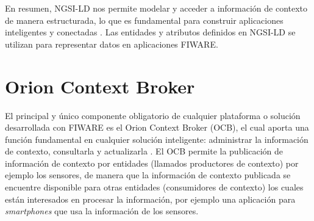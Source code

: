 En resumen, NGSI-LD nos permite modelar y acceder a información de contexto de manera estructurada, lo que es fundamental para construir aplicaciones inteligentes y conectadas \cite{fiware_ngsi_ld}. Las entidades y atributos definidos en NGSI-LD se utilizan para representar datos en aplicaciones FIWARE.


\section{Orion Context Broker}
El principal y único componente obligatorio de cualquier plataforma o solución desarrollada con FIWARE es el Orion Context Broker (OCB), el cual aporta una función fundamental en cualquier solución inteligente: administrar la información de contexto, consultarla y actualizarla \cite{orion}. El OCB permite la publicación de información de contexto por entidades (llamados productores de contexto) por ejemplo los sensores, de manera que la información de contexto publicada se encuentre disponible para otras entidades (consumidores de contexto) los cuales están interesados en procesar la información, por ejemplo una aplicación para \textit{smartphones} que usa la información de los sensores.




